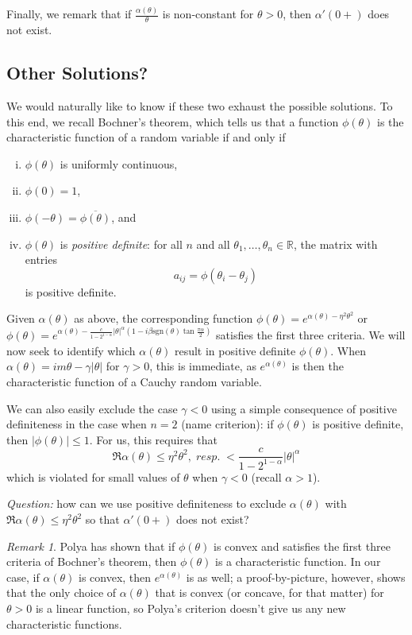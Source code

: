 \documentclass{article}
\theoremstyle{remark}
\newtheorem{rem}{Remark}
\theoremstyle{definition}
\begin{document}
Finally, we remark that if $\frac{\alpha(\theta)}{\theta}$ is non-constant for $\theta > 0$, then $\alpha'(0+)$ does not exist. 

\subsection{Other Solutions?}

We would naturally like to know if these two exhaust the possible solutions.  To this end, we recall Bochner's theorem, which tells us that a function $\phi(\theta)$ is the characteristic function of a random variable if and only if
\begin{enumerate}[(i)]
\item $\phi(\theta)$ is uniformly continuous,
\item $\phi(0) = 1$,
\item $\phi(-\theta) = \overline{\phi(\theta)}$, and
\item $\phi(\theta)$ is \textit{positive definite}: for all $n$ and all $\theta_{1},\ldots,\theta_{n} \in \mathbb{R}$, the matrix with entries
\[
	a_{ij} = \phi(\theta_{i}-\theta_{j})
\]
is positive definite.
\end{enumerate}
Given $\alpha(\theta)$ as above, the corresponding function $\phi(\theta) = e^{\alpha(\theta)-\eta^{2}\theta^{2}}$ 
or $\phi(\theta) = e^{\alpha(\theta) - \frac{c}{1-2^{1-\alpha}}|\theta|^{\alpha}\left(1-i\beta \text{sgn}(\theta) \tan{\frac{\pi\alpha}{2}}\right)}$ satisfies the first three criteria.  We will now seek to identify which $\alpha(\theta)$ result in positive definite $\phi(\theta)$.  When $\alpha(\theta) = im \theta -\gamma|\theta|$ for $\gamma > 0$, this is immediate, as $e^{\alpha(\theta)}$ is then the characteristic function of a Cauchy random variable.

We can also easily exclude the case $\gamma < 0$ using a simple consequence of positive definiteness in the case when $n=2$ (name criterion): if $\phi(\theta)$ is positive definite, then $|\phi(\theta)| \leq 1$.  For us, this requires that 
\[
	\Re \alpha(\theta) \leq  \eta^{2} \theta^{2},\; resp. \; < \frac{c}{1-2^{1-\alpha}}|\theta|^{\alpha}
\]
which is violated for small values of $\theta$ when $\gamma < 0$ (recall $\alpha > 1$). 

\noindent\emph{Question:} how can we use positive definiteness to exclude $\alpha(\theta)$ with $\Re \alpha(\theta) \leq  \eta^{2} \theta^{2}$ so that $\alpha'(0+)$ does not exist?

\begin{rem}
Polya has shown that if $\phi(\theta)$ is convex and satisfies the first three criteria of Bochner's theorem, then $\phi(\theta)$ is a characteristic function.  In our case, if $\alpha(\theta)$ is convex, then $e^{\alpha(\theta)}$ is as well; a proof-by-picture, however, shows that the only choice of $\alpha(\theta)$ that is convex (or concave, for that matter) for $\theta > 0$ is a linear function, so Polya's criterion doesn't give us any new characteristic functions.
\end{rem}
\end{document}
